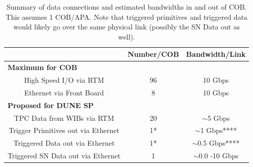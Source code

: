 \begin{table}[htp]
\begin{center}
\begin{tabular}{|c|c|c|}
\hline
     & Number/COB           &     Bandwidth/Link \\
     \hline
\multicolumn{3}{|l|}{\bf{Maximum for COB}} \\
\hline
High Speed I/O via RTM & 96 & 10 Gbps \\
Ethernet via Front Board & 8  & 10 Gbps \\
\hline
\multicolumn{3}{|l|}{\bf{Proposed for DUNE SP}} \\
\hline
TPC Data from WIBs via RTM & 20 & $\sim$5 Gbps\\
Trigger Primitives out via Ethernet  &  1*  &  $\sim$1 Gbps**** \\
Triggered Data out via Ethernet  &  1* &  $\sim$0.5 Gbps**** \\
Triggered SN Data out via Ethernet  & 1   &  $\sim$0.0 -10 Gbps\\
\hline
\end{tabular}
\end{center}
\caption{Summary of data connections and estimated bandwidths in and out of COB. This assumes 1 COB/APA.  Note that triggered primitives and triggered data would likely go over the same physical link (possibly the SN Data out as well).  }
\label{default}
\end{table}%

